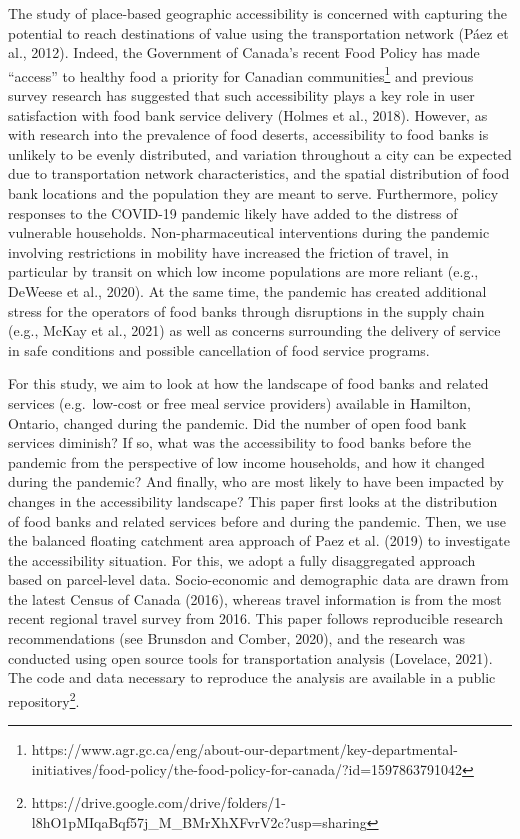 \documentclass[]{elsarticle} %
\begin{document}
The study of place-based geographic accessibility is concerned with
capturing the potential to reach destinations of value using the
transportation network (Páez et al., 2012). Indeed, the Government of
Canada's recent Food Policy has made ``access'' to healthy food a
priority for Canadian communities\footnote{https://www.agr.gc.ca/eng/about-our-department/key-departmental-initiatives/food-policy/the-food-policy-for-canada/?id=1597863791042}
and previous survey research has suggested that such accessibility plays
a key role in user satisfaction with food bank service delivery (Holmes
et al., 2018). However, as with research into the prevalence of food
deserts, accessibility to food banks is unlikely to be evenly
distributed, and variation throughout a city can be expected due to
transportation network characteristics, and the spatial distribution of
food bank locations and the population they are meant to serve.
Furthermore, policy responses to the COVID-19 pandemic likely have added
to the distress of vulnerable households. Non-pharmaceutical
interventions during the pandemic involving restrictions in mobility
have increased the friction of travel, in particular by transit on which
low income populations are more reliant (e.g., DeWeese et al., 2020). At
the same time, the pandemic has created additional stress for the
operators of food banks through disruptions in the supply chain (e.g.,
McKay et al., 2021) as well as concerns surrounding the delivery of
service in safe conditions and possible cancellation of food service
programs.

For this study, we aim to look at how the landscape of food banks and
related services (e.g.~low-cost or free meal service providers)
available in Hamilton, Ontario, changed during the pandemic. Did the
number of open food bank services diminish? If so, what was the
accessibility to food banks before the pandemic from the perspective of
low income households, and how it changed during the pandemic? And
finally, who are most likely to have been impacted by changes in the
accessibility landscape? This paper first looks at the distribution of
food banks and related services before and during the pandemic. Then, we
use the balanced floating catchment area approach of Paez et al. (2019)
to investigate the accessibility situation. For this, we adopt a fully
disaggregated approach based on parcel-level data. Socio-economic and
demographic data are drawn from the latest Census of Canada (2016),
whereas travel information is from the most recent regional travel
survey from 2016. This paper follows reproducible research
recommendations (see Brunsdon and Comber, 2020), and the research was
conducted using open source tools for transportation analysis (Lovelace,
2021). The code and data necessary to reproduce the analysis are
available in a public repository\footnote{https://drive.google.com/drive/folders/1-l8hO1pMIqaBqf57j\_M\_BMrXhXFvrV2c?usp=sharing}.
\end{document}

